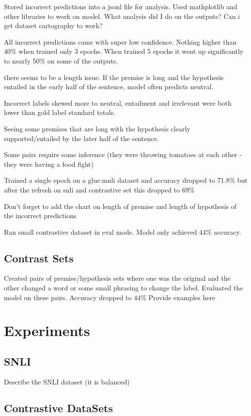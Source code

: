 \documentclass[11pt]{article}
\begin{document}
Stored incorrect predictions into a jsonl file for analysis. Used mathplotlib and other libraries to work on model.
What analysis did I do on the outputs? Can i get dataset cartography to work?

All incorrect predictions came with super low confidence. Nothing higher than 40\% when trained only 3 epochs. When trained 5 epochs it went up significantly to nearly 50\% on some of the outputs.

there seems to be a length issue. If the premise is long and the hypothesis entailed in the early half of the sentence, model often predicts neutral.

Incorrect labels skewed more to neutral, entailment and irrelevant were both lower than gold label standard totals.

Seeing some premises that are long with the hypothesis clearly supported/entailed by the later half of the sentence. 

Some pairs require some inference (they were throwing tomatoes at each other - they were having a food fight)

Trained a single epoch on a glue:mnli dataset and accuracy dropped to 71.8\%  but after the refresh on snli and contrastive set this dropped to 69\%

Don't forget to add the chart on length of premise and length of hypothesis of the incorrect predictions

Ran small contrastive dataset in eval mode. Model only achieved 44\% accuracy.
\subsection{Contrast Sets}
Created pairs of premise/hypothesis sets where one was the original and the other changed a word or some small phrasing to change the label. Evaluated the model on these pairs. Accuracy dropped to 44\%  Provide examples here

\section{Experiments}
\subsection{SNLI}

Describe the SNLI dataset (it is balanced) \citealp{dataAug}
\subsection{Contrastive DataSets}
\end{document}
